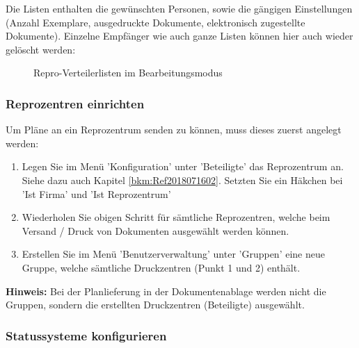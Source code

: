 Die Listen enthalten die gewünschten Personen, sowie die gängigen Einstellungen (Anzahl Exemplare, ausgedruckte Dokumente, elektronisch zugestellte Dokumente). Einzelne Empfänger wie auch ganze Listen können hier auch wieder gelöscht werden:

\begin{figure}[H]
\caption{Repro-Verteilerlisten im Bearbeitungsmodus}
\end{figure}

\subsubsection{Reprozentren einrichten}
\label{bkm:Ref2018071601}

Um Pläne an ein Reprozentrum senden zu können, muss dieses zuerst angelegt werden:

\begin{enumerate}
\item Legen Sie im Menü 'Konfiguration' unter 'Beteiligte' das Reprozentrum an. Siehe dazu auch Kapitel \ref{bkm:Ref2018071602}. Setzten Sie ein Häkchen bei 'Ist Firma' und 'Ist Reprozentrum'
\item Wiederholen Sie obigen Schritt für sämtliche Reprozentren, welche beim Versand / Druck von Dokumenten ausgewählt werden können.
\item Erstellen Sie im Menü 'Benutzerverwaltung' unter 'Gruppen' eine neue Gruppe, welche sämtliche Druckzentren (Punkt 1 und 2) enthält.
\end{enumerate}

\textbf{Hinweis:} Bei der Planlieferung in der Dokumentenablage werden nicht die Gruppen, sondern die erstellten Druckzentren (Beteiligte) ausgewählt.

\subsubsection{Statussysteme konfigurieren}

